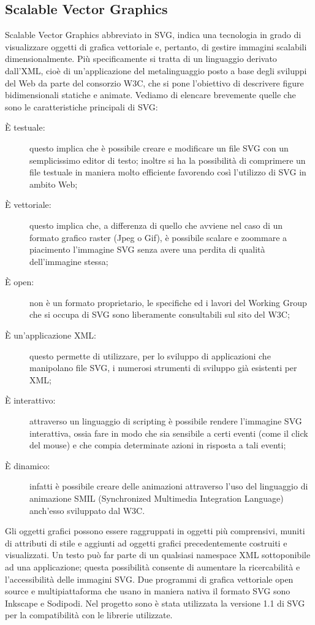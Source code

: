 \subsection{Scalable Vector Graphics}
Scalable Vector Graphics abbreviato in SVG, indica una tecnologia in grado di visualizzare oggetti di grafica vettoriale e, pertanto, di gestire immagini scalabili dimensionalmente.
Più specificamente si tratta di un linguaggio derivato dall'XML, cioè di un'applicazione del metalinguaggio posto a base degli sviluppi del Web da parte del consorzio W3C, che si pone l'obiettivo di descrivere figure bidimensionali statiche e animate.
Vediamo di elencare brevemente quelle che sono le caratteristiche principali di SVG:
\begin{description}
\item[È testuale:]questo implica che è possibile creare e modificare un file SVG con un semplicissimo editor di testo; inoltre si ha la possibilità di comprimere un file testuale in maniera molto efficiente favorendo così l’utilizzo di SVG in ambito Web;
\item[È vettoriale:]questo implica che, a differenza di quello che avviene nel caso di un formato grafico raster (Jpeg o Gif), è possibile scalare e zoommare a piacimento l’immagine SVG senza avere una perdita di qualità dell’immagine stessa;
\item[È open:]non è un formato proprietario, le specifiche ed i lavori del Working Group che si occupa di SVG sono liberamente consultabili sul sito del W3C;
\item[È un’applicazione XML:]questo permette di utilizzare, per lo sviluppo di applicazioni che manipolano file SVG, i numerosi strumenti di sviluppo già esistenti per XML;
\item[È interattivo:]attraverso un linguaggio di scripting è possibile rendere l’immagine SVG interattiva, ossia fare in modo che sia sensibile a certi eventi (come il click del mouse) e che compia determinate azioni in risposta a tali eventi;
\item[È dinamico:]infatti è possibile creare delle animazioni attraverso l’uso del linguaggio di animazione SMIL (Synchronized Multimedia Integration Language) anch’esso sviluppato dal W3C.
\end{description}

Gli oggetti grafici possono essere raggruppati in oggetti più comprensivi, muniti di attributi di stile e aggiunti ad oggetti grafici precedentemente costruiti e visualizzati. Un testo può far parte di un qualsiasi namespace XML sottoponibile ad una applicazione; questa possibilità consente di aumentare la ricercabilità e l'accessibilità delle immagini SVG.
Due programmi di grafica vettoriale open source e multipiattaforma che usano in maniera nativa il formato SVG sono Inkscape e Sodipodi.
Nel progetto sono è stata utilizzata la versione 1.1 di SVG per la compatibilità con le librerie utilizzate.